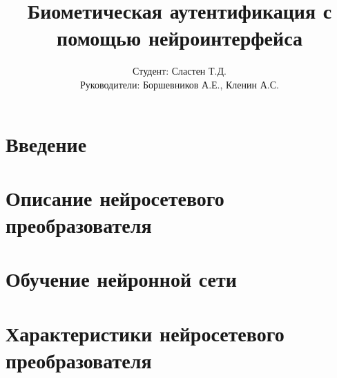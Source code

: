 \documentclass{beamer}
\title{Биометическая аутентификация с помощью нейроинтерфейса}
\author{Студент: Сластен Т.Д. \\ Руководители: Боршевников А.Е., Кленин А.С.}
\institute{Б8303а Прикладная математика и информатика}
\date{}
\begin{document}
\maketitle

\section{Введение}





\section{Описание нейросетевого преобразователя}




\section{Обучение нейронной сети}



\section{Характеристики нейросетевого преобразователя}

\end{document}
